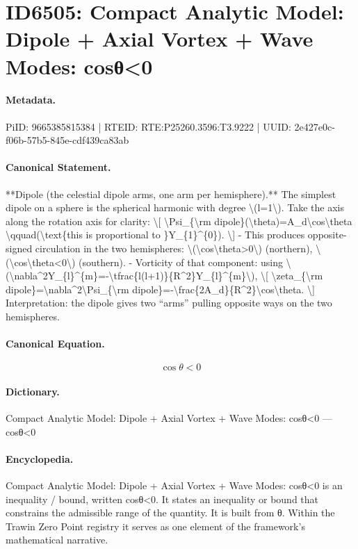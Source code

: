 \section*{ID6505: Compact Analytic Model: Dipole + Axial Vortex + Wave Modes: cosθ<0}
\paragraph{Metadata.}
PiID: 9665385815384 | RTEID: RTE:P25260.3596:T3.9222 | UUID: 2e427e0c-f06b-57b5-845e-cdf439ca83ab

\paragraph{Canonical Statement.}
**Dipole (the celestial dipole arms, one arm per hemisphere).** The simplest dipole on a sphere is the spherical harmonic with degree \textbackslash{}(l=1\textbackslash{}). Take the axis along the rotation axis for clarity: \textbackslash{}[ \textbackslash{}Psi\_\{\textbackslash{}rm dipole\}(\textbackslash{}theta)=A\_d\textbackslash{}cos\textbackslash{}theta \textbackslash{}qquad(\textbackslash{}text\{this is proportional to \}Y\_\{1\}\textasciicircum{}\{0\}). \textbackslash{}] - This produces opposite-signed circulation in the two hemispheres: \textbackslash{}(\textbackslash{}cos\textbackslash{}theta>0\textbackslash{}) (northern), \textbackslash{}(\textbackslash{}cos\textbackslash{}theta<0\textbackslash{}) (southern). - Vorticity of that component: using \textbackslash{}(\textbackslash{}nabla\textasciicircum{}2Y\_\{l\}\textasciicircum{}\{m\}=-\textbackslash{}tfrac\{l(l+1)\}\{R\textasciicircum{}2\}Y\_\{l\}\textasciicircum{}\{m\}\textbackslash{}), \textbackslash{}[ \textbackslash{}zeta\_\{\textbackslash{}rm dipole\}=\textbackslash{}nabla\textasciicircum{}2\textbackslash{}Psi\_\{\textbackslash{}rm dipole\}=-\textbackslash{}frac\{2A\_d\}\{R\textasciicircum{}2\}\textbackslash{}cos\textbackslash{}theta. \textbackslash{}] Interpretation: the dipole gives two “arms” pulling opposite ways on the two hemispheres.

\paragraph{Canonical Equation.}
\[
\cos\theta<0
\]

\paragraph{Dictionary.}
Compact Analytic Model: Dipole + Axial Vortex + Wave Modes: cosθ<0 — cosθ<0

\paragraph{Encyclopedia.}
Compact Analytic Model: Dipole + Axial Vortex + Wave Modes: cosθ<0 is an inequality / bound, written cosθ<0. It states an inequality or bound that constrains the admissible range of the quantity. It is built from θ. Within the Trawin Zero Point registry it serves as one element of the framework's mathematical narrative.
